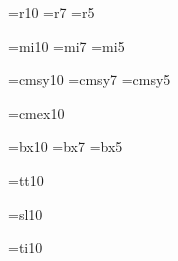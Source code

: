 %


\font\tenrm=\fontprefix r10 %
\font\sevenrm=\fontprefix r7
\font\fiverm=\fontprefix r5

\font\teni=\miprefix mi10 %
\font\seveni=\miprefix mi7
\font\fivei=\miprefix mi5

\font\tensy=cmsy10 %
\font\sevensy=cmsy7
\font\fivesy=cmsy5

\font\tenex=cmex10 %



\font\tenbf=\fontprefix bx10 %
\font\sevenbf=\fontprefix bx7
\font\fivebf=\fontprefix bx5

\font\tentt=\fontprefix tt10 %


\font\tensl=\fontprefix sl10 %

\font\tenit=\fontprefix ti10 %









\let\preloaded=\undefined %
